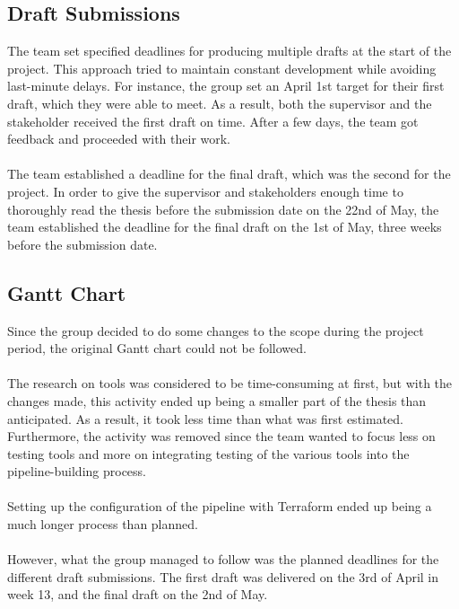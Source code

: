 \subsection{Draft Submissions}
The team set specified deadlines for producing multiple drafts at the start of the project. This approach tried to maintain constant development while avoiding last-minute delays. For instance, the group set an April 1st target for their first draft, which they were able to meet. As a result, both the supervisor and the stakeholder received the first draft on time. After a few days, the team got feedback and proceeded with their work. 
\\~\\
The team established a deadline for the final draft, which was the second for the project. In order to give the supervisor and stakeholders enough time to thoroughly read the thesis before the submission date on the 22nd of May, the team established the deadline for the final draft on the 1st of May, three weeks before the submission date. 


\subsection{Gantt Chart}
Since the group decided to do some changes to the scope during the project period, the original Gantt chart could not be followed. 
\\~\\
The research on tools was considered to be time-consuming at first, but with the changes made, this activity ended up being a smaller part of the thesis than anticipated. As a result, it took less time than what was first estimated. Furthermore, the activity was removed since the team wanted to focus less on testing tools and more on integrating testing of the various tools into the pipeline-building process. 
\\~\\
Setting up the configuration of the pipeline with Terraform ended up being a much longer process than planned. 
\\~\\
However, what the group managed to follow was the planned deadlines for the different draft submissions. The first draft was delivered on the 3rd of April in week 13, and the final draft on the 2nd of May.


